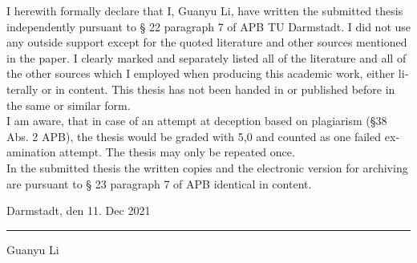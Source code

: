 \documentclass[11pt,longdoc,accentcolor=tud1b,paper=a4]{tuddesign/tudreport}
\newcounter{dummy} %
\newcommand{\komName}{Guanyu Li\xspace}
\newcommand{\komSubmissionDate}{11. Dec 2021\xspace}%
\begin{document}
\begin{otherlanguage}{ngerman}
{	\noindent I herewith formally declare that I, \komName, have written the submitted thesis independently pursuant to § 22 paragraph 7 of APB TU Darmstadt. 
	I did not use any outside support except for the quoted literature and other sources mentioned in the paper. 
	I clearly marked and separately listed all of the literature and all of the other sources which I employed when producing this academic work, either literally or in content.
	This thesis has not been handed in or published before in the same or similar form. \\

	\noindent I am aware, that in case of an attempt at deception based on plagiarism (§38 Abs. 2 APB), the thesis would be graded with 5,0 and counted as one failed examination attempt. 
	The thesis may only be repeated once. \\
	
    \noindent In the submitted thesis the written copies and the electronic version for archiving are pursuant to § 23 paragraph 7 of APB identical in content.
    
	}{}	
    \vspace{4em}
    
    \noindent Darmstadt, den \komSubmissionDate 
    
    \vspace{3em}
    
    \noindent\rule{5cm}{0.4pt}
    
    \noindent\komName
    
    \end{otherlanguage}
   
	\tableofcontents
	
	\cleardoublepage

	
	
	
	
	
\end{document}

